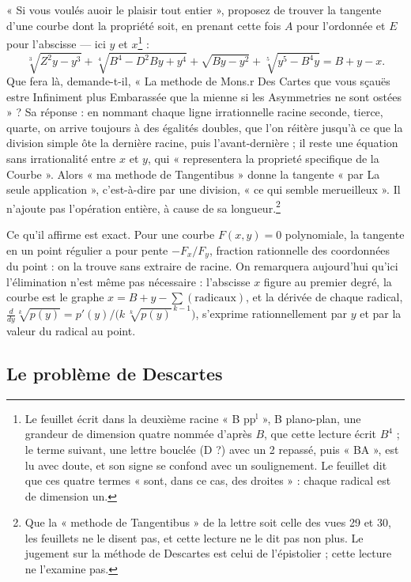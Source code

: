 \documentclass[11pt,a4paper]{article}
\begin{document}
« Si vous voulés auoir le plaisir tout entier », proposez de trouver la
tangente d'une courbe dont la propriété soit, en prenant cette fois $A$ pour
l'ordonnée et $E$ pour l'abscisse — ici $y$ et $x$\footnote{Le feuillet écrit
dans la deuxième racine « B pp$^{\text{l}}$ », B plano-plan, une grandeur de
dimension quatre nommée d'après $B$, que cette lecture écrit $B^4$ ; le terme
suivant, une lettre bouclée (D ?) avec un 2 repassé, puis « BA », est lu avec
doute, et son signe se confond avec un soulignement. Le feuillet dit que ces
quatre termes « sont, dans ce cas, des droites » : chaque radical est de
dimension un.} :
\[ \sqrt[3]{Z^2y - y^3} + \sqrt[4]{B^4 - D^2By + y^4} + \sqrt{By - y^2}
   + \sqrt[5]{y^5 - B^4y} = B + y - x . \]
Que fera là, demande-t-il, « La methode de Mons.r Des Cartes que vous sçauës estre
Infiniment plus Embarassée que la mienne si les Asymmetries ne sont ostées » ?
Sa réponse : en nommant chaque ligne irrationnelle racine seconde, tierce,
quarte, on arrive toujours à des égalités doubles, que l'on réitère jusqu'à ce
que la division simple ôte la dernière racine, puis l'avant-dernière ; il reste
une équation sans irrationalité entre $x$ et $y$, qui « representera la
proprieté specifique de la Courbe ». Alors « ma methode de Tangentibus » donne
la tangente « par La seule application », c'est-à-dire par une division, « ce
qui semble merueilleux ». Il n'ajoute pas l'opération entière, à cause de sa
longueur.\footnote{Que la « methode de Tangentibus » de la lettre soit celle des
vues 29 et 30, les feuillets ne le disent pas, et cette lecture ne le dit pas
non plus. Le jugement sur la méthode de Descartes est celui de l'épistolier ;
cette lecture ne l'examine pas.}

Ce qu'il affirme est exact. Pour une courbe $F(x,y) = 0$ polynomiale, la
tangente en un point régulier a pour pente $-F_x/F_y$, fraction rationnelle des
coordonnées du point : on la trouve sans extraire de racine. On remarquera
aujourd'hui qu'ici l'élimination n'est même pas nécessaire : l'abscisse $x$
figure au premier degré, la courbe est le graphe
$x = B + y - \sum(\text{radicaux})$, et la dérivée de chaque radical,
$\tfrac{d}{dy}\sqrt[k]{p(y)} = p'(y)/\bigl(k\,\sqrt[k]{p(y)}^{\,k-1}\bigr)$,
s'exprime rationnellement par $y$ et par la valeur du radical au point.

\subsection*{Le problème de Descartes}
\end{document}
